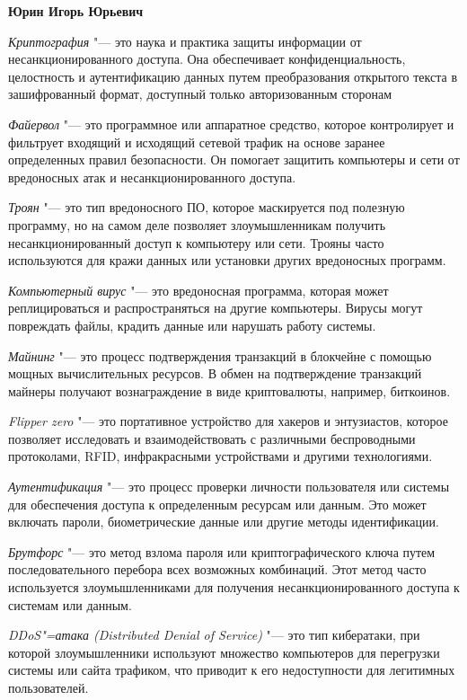 \documentclass{article}
\begin{document}
\begin{center}
\textbf{Юрин Игорь Юрьевич}
\end{center}

\textit{Криптография} "--- это наука и практика защиты информации от несанкционированного доступа. Она обеспечивает конфиденциальность, целостность и аутентификацию данных путем преобразования открытого текста в зашифрованный формат, доступный только авторизованным сторонам

\textit{Файервол} "--- это программное или аппаратное средство, которое контролирует и фильтрует входящий и исходящий сетевой трафик на основе заранее определенных правил безопасности. Он помогает защитить компьютеры и сети от вредоносных атак и несанкционированного доступа.

\textit{Троян} "--- это тип вредоносного ПО, которое маскируется под полезную программу, но на самом деле позволяет злоумышленникам получить несанкционированный доступ к компьютеру или сети. Трояны часто используются для кражи данных или установки других вредоносных программ.

\textit{Компьютерный вирус} "--- это вредоносная программа, которая может реплицироваться и распространяться на другие компьютеры. Вирусы могут повреждать файлы, крадить данные или нарушать работу системы.

\textit{Майнинг} "--- это процесс подтверждения транзакций в блокчейне с помощью мощных вычислительных ресурсов. В обмен на подтверждение транзакций майнеры получают вознаграждение в виде криптовалюты, например, биткоинов.

\textit{Flipper zero} "--- это портативное устройство для хакеров и энтузиастов, которое позволяет исследовать и взаимодействовать с различными беспроводными протоколами, RFID, инфракрасными устройствами и другими технологиями.

\textit{Аутентификация} "--- это процесс проверки личности пользователя или системы для обеспечения доступа к определенным ресурсам или данным. Это может включать пароли, биометрические данные или другие методы идентификации.

\textit{Брутфорс} "--- это метод взлома пароля или криптографического ключа путем последовательного перебора всех возможных комбинаций. Этот метод часто используется злоумышленниками для получения несанкционированного доступа к системам или данным.

\textit{DDoS"=атака (Distributed Denial of Service)} "--- это тип кибератаки, при которой злоумышленники используют множество компьютеров для перегрузки системы или сайта трафиком, что приводит к его недоступности для легитимных пользователей.
\end{document}
